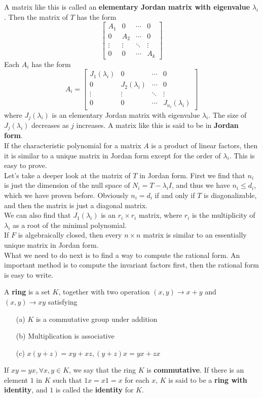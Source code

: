 \documentclass{article}
\begin{document}
A matrix like this is called an \textbf{elementary Jordan matrix with eigenvalue} $\lambda_i$. Then the matrix of $T$ has the form
\[\begin{bmatrix}
	A_1&0&\cdots&0\\
	0&A_2&\cdots&0\\
	\vdots&\vdots&\ddots&\vdots\\
	0&0&\cdots&A_k
\end{bmatrix}\]
Each $A_i$ has the form
\[A_i=\begin{bmatrix}
	J_1(\lambda_i)&0&\cdots&0\\
	0&J_2(\lambda_i)&\cdots&0\\
	\vdots&\vdots&\ddots&\vdots\\
	0&0&\cdots&J_{n_i}(\lambda_i)
\end{bmatrix}\]
where $J_j(\lambda_i)$ is an elementary Jordan matrix with eigenvalue $\lambda_i$. The size of $J_j(\lambda_i)$ decreases as $j$ increases. A matrix like this is said to be in \textbf{Jordan form}.\\
\indent If the characteristic polynomial for a matrix $A$ is a product of linear factors, then it is similar to a unique matrix in Jordan form except for the order of $\lambda_i$. This is easy to prove.\\
\indent Let's take a deeper look at the matrix of $T$ in Jordan form. First we find that $n_i$ is just the dimension of the null space of $N_i=T-\lambda_iI$, and thus we have $n_i\le d_i$, which we have proven before. Obviously $n_i=d_i$ if and only if $T$ is diagonalizable, and then the matrix is just a diagonal matrix.\\
\indent We can also find that $J_1(\lambda_i)$ is an $r_i\times r_i$ matrix, where $r_i$ is the multiplicity of $\lambda_i$ as a root of the minimal polynomial.\\
\indent If $F$ is algebraically closed, then every $n\times n$ matrix is similar to an essentially unique matrix in Jordan form.\\
\indent What we need to do next is to find a way to compute the rational form. An important method is to compute the invariant factors first, then the rational form is easy to write.
\begin{dde}
	A \textbf{ring} is a set $K$, together with two operation $(x,y)\rightarrow x+y$ and $(x,y)\rightarrow xy$ satisfying
	\begin{enumerate}
		\item [(a)]$K$ is a commutative group under addition
		\item [(b)]Multiplication is associative
		\item [(c)]$x(y+z)=xy+xz,(y+z)x=yx+zx$
	\end{enumerate}
	If $xy=yx,\forall x,y\in K$, we say that the ring $K$ is \textbf{commutative}. If there is an element $1$ in $K$ such that $1x=x1=x$ for each $x$, $K$ is said to be a \textbf{ring with identity}, and $1$ is called the \textbf{identity} for $K$.
\end{dde}
\end{document}
